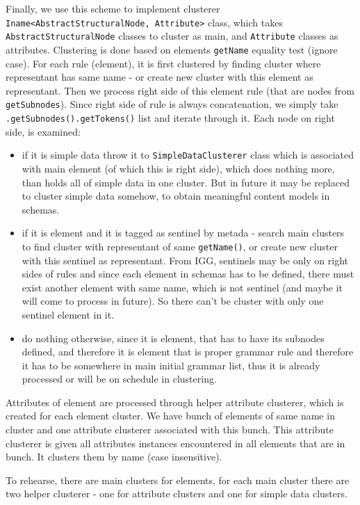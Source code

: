 \documentclass[a4paper,10pt,oneside]{article}
\newcommand{\code}[1]{\texttt{#1}}
\begin{document}
Finally, we use this scheme to implement clusterer \code{Iname<AbstractStructuralNode, Attribute>} class, which takes \code{AbstractStructuralNode} classes to cluster as main, and \code{Attribute} classes as attributes.
Clustering is done based on elements \code{getName} equality test (ignore case).
For each rule (element), it is first clustered by finding cluster where representant has same name - or create new cluster with this element as representant.
Then we process right side of this element rule (that are nodes from \code{getSubnodes}).
Since right side of rule is always concatenation, we simply take \code{.getSubnodes().getTokens()} list and iterate through it.
Each node on right side, is examined:
\begin{itemize}
  \item if it is simple data throw it to \code{SimpleDataClusterer} class which is associated with main element (of which this is right side), which does nothing more, than holds all of simple data in one cluster. But in future it may be replaced to cluster simple data somehow, to obtain meaningful content models in schemas.
  \item if it is element and it is tagged as sentinel by metada - search main clusters to find cluster with representant of same \code{getName()}, or create new cluster with this sentinel as representant. From IGG, sentinels may be only on right sides of rules and since each element in schemas has to be defined, there must exist another element with same name, which is not sentinel (and maybe it will come to process in future). So there can't be cluster with only one sentinel element in it.
  \item do nothing otherwise, since it is element, that has to have its subnodes defined, and therefore it is element that is proper grammar rule and therefore it has to be somewhere in main initial grammar list, thus it is already processed or will be on schedule in clustering.
\end{itemize}
Attributes of element are processed through helper attribute clusterer, which is created for each element cluster.
We have bunch of elements of same name in cluster and one attribute clusterer associated with this bunch.
This attribute clusterer is given all attributes instances encountered in all elements that are in bunch.
It clusters them by name (case insensitive).

To rehearse, there are main clusters for elements, for each main cluster there are two helper clusterer - one for attribute clusters and one for simple data clusters.
\end{document}
